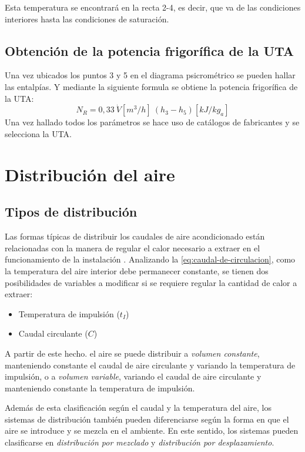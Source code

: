 Esta temperatura se encontrar\'a en la recta 2-4, es decir, que va de las condiciones interiores hasta las condiciones de saturaci\'on.
\subsection{Obtenci\'on de la potencia frigor\'ifica de la UTA}
Una vez ubicados los puntos 3 y 5 en el diagrama psicrom\'etrico se pueden hallar las entalp\'ias. Y mediante la siguiente formula se obtiene la potencia frigor\'ifica de la UTA:
\begin{equation*}
	N_R=0,33\ \dot{V}[m^3/h]\ (h_3 - h_5)[kJ/kg_a]
\end{equation*}
Una vez hallado todos los par\'ametros se hace uso de cat\'alogos de fabricantes y se selecciona la UTA.

\section{Distribución del aire}

\subsection{Tipos de distribución}
Las formas típicas de distribuir los caudales de aire acondicionado están relacionadas con la manera de regular el calor necesario a extraer en el funcionamiento de la instalación \parencite{quadri2020}. Analizando la \autoref{eq:caudal-de-circulacion}, como la temperatura del aire interior debe permanecer constante, se tienen dos posibilidades de variables a modificar si se requiere regular la cantidad de calor a extraer:
\begin{itemize}
	\item Temperatura de impulsión ($t_I$)
	\item Caudal circulante ($C$)
\end{itemize}

A partir de este hecho. el aire se puede distribuir a \emph{volumen constante}, manteniendo constante el caudal de aire circulante y variando la temperatura de impulsión, o a \emph{volumen variable}, variando el caudal de aire circulante y manteniendo constante la temperatura de impulsión.

Además de esta clasificación según el caudal y la temperatura del aire, los sistemas de distribución también pueden diferenciarse según la forma en que el aire se introduce y se mezcla en el ambiente. En este sentido, los sistemas pueden clasificarse en \emph{distribución por mezclado} y \emph{distribución por desplazamiento}.


